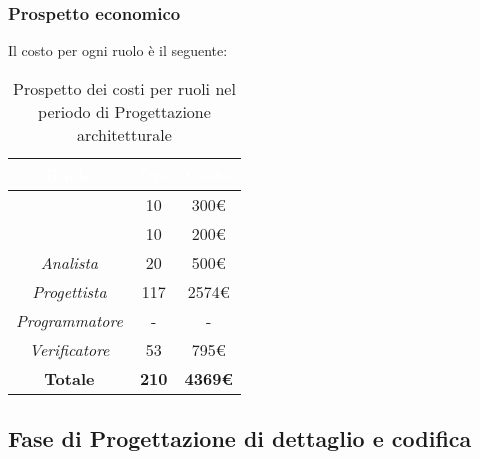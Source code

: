 \subsubsection{Prospetto economico}
Il costo per ogni ruolo è il seguente:
\begin{table}[H]
	\begin{center}
		\begin{tabular}{ c c c }
		\rowcolor{darkblue} 
		\textcolor{white}{\textbf{Ruolo}} & \textcolor{white}{\textbf{Ore}} & \textcolor{white}{\textbf{Costo}} \\ \hline
		\textit{\Responsabile} & 10 & 300€ \\ \hline
		\textit{\Amministratore} & 10 & 200€ \\ \hline
		\textit{Analista} & 20 & 500€ \\ \hline
		\textit{Progettista} & 117 & 2574€\\ \hline
		\textit{Programmatore}  & - & - \\ \hline
		\textit{Verificatore} & 53 & 795€ \\ \hline
		\textbf{Totale} & \textbf{210} & \textbf{4369€} \\ \hline
		\end{tabular}
	\caption{ Prospetto dei costi per ruoli nel periodo di Progettazione architetturale}
	\end{center}
\end{table}

\subsection{Fase di Progettazione di dettaglio e codifica}
